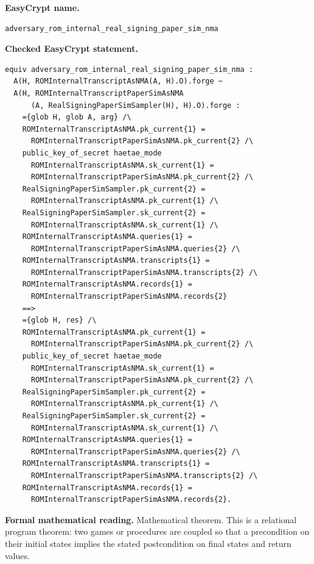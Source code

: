 \begin{formaltheorem}
\noindent\textbf{EasyCrypt name.}
\begin{lstlisting}[language=EasyCrypt,basicstyle=\ttfamily\scriptsize]
adversary_rom_internal_real_signing_paper_sim_nma
\end{lstlisting}
\noindent\textbf{Checked EasyCrypt statement.}
\begin{lstlisting}[language=EasyCrypt,basicstyle=\ttfamily\scriptsize]
equiv adversary_rom_internal_real_signing_paper_sim_nma :
  A(H, ROMInternalTranscriptAsNMA(A, H).O).forge ~
  A(H, ROMInternalTranscriptPaperSimAsNMA
      (A, RealSigningPaperSimSampler(H), H).O).forge :
    ={glob H, glob A, arg} /\
    ROMInternalTranscriptAsNMA.pk_current{1} =
      ROMInternalTranscriptPaperSimAsNMA.pk_current{2} /\
    public_key_of_secret haetae_mode
      ROMInternalTranscriptAsNMA.sk_current{1} =
      ROMInternalTranscriptPaperSimAsNMA.pk_current{2} /\
    RealSigningPaperSimSampler.pk_current{2} =
      ROMInternalTranscriptAsNMA.pk_current{1} /\
    RealSigningPaperSimSampler.sk_current{2} =
      ROMInternalTranscriptAsNMA.sk_current{1} /\
    ROMInternalTranscriptAsNMA.queries{1} =
      ROMInternalTranscriptPaperSimAsNMA.queries{2} /\
    ROMInternalTranscriptAsNMA.transcripts{1} =
      ROMInternalTranscriptPaperSimAsNMA.transcripts{2} /\
    ROMInternalTranscriptAsNMA.records{1} =
      ROMInternalTranscriptPaperSimAsNMA.records{2}
    ==>
    ={glob H, res} /\
    ROMInternalTranscriptAsNMA.pk_current{1} =
      ROMInternalTranscriptPaperSimAsNMA.pk_current{2} /\
    public_key_of_secret haetae_mode
      ROMInternalTranscriptAsNMA.sk_current{1} =
      ROMInternalTranscriptPaperSimAsNMA.pk_current{2} /\
    RealSigningPaperSimSampler.pk_current{2} =
      ROMInternalTranscriptAsNMA.pk_current{1} /\
    RealSigningPaperSimSampler.sk_current{2} =
      ROMInternalTranscriptAsNMA.sk_current{1} /\
    ROMInternalTranscriptAsNMA.queries{1} =
      ROMInternalTranscriptPaperSimAsNMA.queries{2} /\
    ROMInternalTranscriptAsNMA.transcripts{1} =
      ROMInternalTranscriptPaperSimAsNMA.transcripts{2} /\
    ROMInternalTranscriptAsNMA.records{1} =
      ROMInternalTranscriptPaperSimAsNMA.records{2}.
\end{lstlisting}
\noindent\textbf{Formal mathematical reading.}
Mathematical theorem. This is a relational program theorem: two games or procedures are coupled so that a precondition on their initial states implies the stated postcondition on final states and return values.


\end{formaltheorem}
